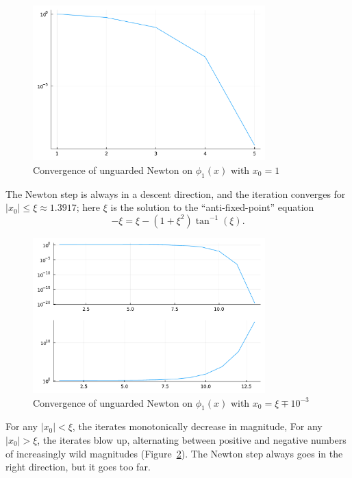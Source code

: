 \documentclass[12pt, leqno]{article} %
\begin{document}
\begin{figure}
\begin{center}
  \includegraphics[width=0.8\textwidth]{fig/2023-04-17-phi1-newton0.pdf}
\end{center}
\caption{Convergence of unguarded Newton on $\phi_1(x)$ with $x_0 = 1$}
\label{fig:phi1-newton0}
\end{figure}

The Newton step is always in a descent direction, and the iteration
converges for \(|x_0| \leq \xi \approx 1.3917\); here \(\xi\) is the
solution to the ``anti-fixed-point'' equation
\[-\xi = \xi - (1+\xi^2) \tan^{-1}(\xi).\]

\begin{figure}
\begin{center}
  \includegraphics[width=0.8\textwidth]{fig/2023-04-17-phi1-newton12.pdf}
\end{center}
\caption{Convergence of unguarded Newton on $\phi_1(x)$ with $x_0 = \xi \mp 10^{-3}$}
\label{fig:phi1-newton12}
\end{figure}

For any $|x_0| < \xi$, the iterates monotonically decrease in magnitude,
For any $|x_0| > \xi$, the iterates blow up, alternating between 
positive and negative numbers of increasingly wild 
magnitudes (Figure~\ref{fig:phi1-newton12}).
The Newton step always goes in the right direction, but it goes too far.
\end{document}
